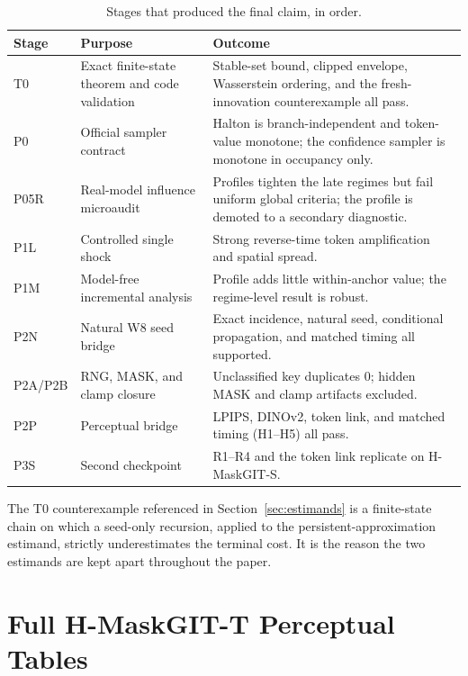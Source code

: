 \documentclass[11pt,a4paper]{article}
\theoremstyle{plain}
\theoremstyle{definition}
\theoremstyle{remark}
\begin{document}
\begin{table}[h]
\centering
\caption{Stages that produced the final claim, in order.}
\label{tab:stages}
\small
\begin{tabular}{@{}>{\raggedright\arraybackslash}p{} >{\raggedright\arraybackslash}p{} >{\raggedright\arraybackslash}p{}@{}}
\toprule
Stage & Purpose & Outcome \\
\midrule
T0 & Exact finite-state theorem and code validation &
Stable-set bound, clipped envelope, Wasserstein ordering, and the
fresh-innovation counterexample all pass. \\
P0 & Official sampler contract &
Halton is branch-independent and token-value monotone; the confidence sampler is
monotone in occupancy only. \\
P05R & Real-model influence microaudit &
Profiles tighten the late regimes but fail uniform global criteria; the profile
is demoted to a secondary diagnostic. \\
P1L & Controlled single shock &
Strong reverse-time token amplification and spatial spread. \\
P1M & Model-free incremental analysis &
Profile adds little within-anchor value; the regime-level result is robust. \\
P2N & Natural W8 seed bridge &
Exact incidence, natural seed, conditional propagation, and matched timing all
supported. \\
P2A/P2B & RNG, MASK, and clamp closure &
Unclassified key duplicates 0; hidden MASK and clamp artifacts excluded. \\
P2P & Perceptual bridge &
LPIPS, DINOv2, token link, and matched timing (H1--H5) all pass. \\
P3S & Second checkpoint &
R1--R4 and the token link replicate on H-MaskGIT-S. \\
\bottomrule
\end{tabular}
\end{table}

The T0 counterexample referenced in Section~\ref{sec:estimands} is a finite-state
chain on which a seed-only recursion, applied to the persistent-approximation
estimand, strictly underestimates the terminal cost. It is the reason the two
estimands are kept apart throughout the paper.

\section{Full H-MaskGIT-T Perceptual Tables}
\label{app:tables}
\end{document}
